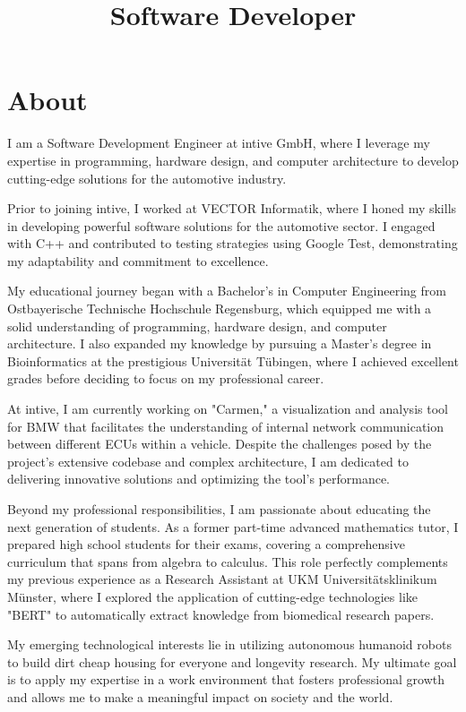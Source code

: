 \documentclass[11pt,a4paper,sans]{moderncv}
\title{Software Developer}
\begin{document}
\makecvtitle

\section{About}
I am a Software Development Engineer at intive GmbH, where I leverage my expertise in programming, hardware design, and computer architecture to develop cutting-edge solutions for the automotive industry.

Prior to joining intive, I worked at VECTOR Informatik, where I honed my skills in developing powerful software solutions for the automotive sector. I engaged with C++ and contributed to testing strategies using Google Test, demonstrating my adaptability and commitment to excellence. 

My educational journey began with a Bachelor's in Computer Engineering from Ostbayerische Technische Hochschule Regensburg, which equipped me with a solid understanding of programming, hardware design, and computer architecture. I also expanded my knowledge by pursuing a Master's degree in Bioinformatics at the prestigious Universität Tübingen, where I achieved excellent grades before deciding to focus on my professional career.

At intive, I am currently working on "Carmen," a visualization and analysis tool for BMW that facilitates the understanding of internal network communication between different ECUs within a vehicle. Despite the challenges posed by the project's extensive codebase and complex architecture, I am dedicated to delivering innovative solutions and optimizing the tool's performance.

Beyond my professional responsibilities, I am passionate about educating the next generation of students. As a former part-time advanced mathematics tutor, I prepared high school students for their exams, covering a comprehensive curriculum that spans from algebra to calculus. This role perfectly complements my previous experience as a Research Assistant at UKM Universitätsklinikum Münster, where I explored the application of cutting-edge technologies like "BERT" to automatically extract knowledge from biomedical research papers.

My emerging technological interests lie in utilizing autonomous humanoid robots to build dirt cheap housing for everyone and longevity research. My ultimate goal is to apply my expertise in a work environment that fosters professional growth and allows me to make a meaningful impact on society and the world.
\end{document}

